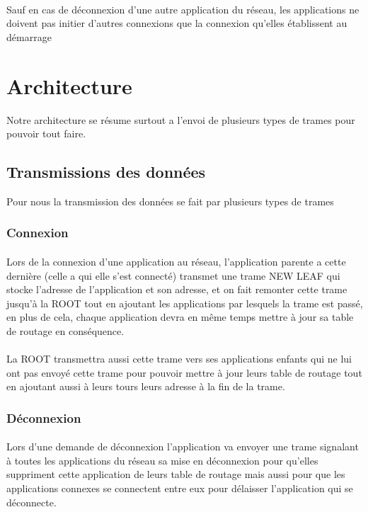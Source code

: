 \documentclass[a4paper,titlepage]{report}
\begin{document}
\paragraph{}
Sauf en cas de déconnexion d'une autre application du réseau, les applications ne doivent pas initier d'autres connexions que la connexion qu'elles établissent au démarrage
\pagebreak







\section{Architecture}
Notre architecture se résume surtout a l'envoi de plusieurs types de trames pour pouvoir tout faire.
\subsection{Transmissions des données}
Pour nous la transmission des données se fait par plusieurs types de trames 
\subsubsection{Connexion}
\paragraph{}
Lors de la connexion d'une application au réseau, l'application parente a cette dernière (celle a qui elle s'est connecté) transmet une trame NEW LEAF qui stocke l'adresse de l'application et son adresse, et on fait remonter cette trame jusqu'à la ROOT tout en ajoutant les applications par lesquels la trame est passé, en plus de cela, chaque application devra en même temps mettre à jour sa table de routage en conséquence. 
\paragraph{}
La ROOT transmettra aussi cette trame vers ses applications enfants qui ne lui ont pas envoyé cette trame pour pouvoir mettre à jour leurs table de routage tout en ajoutant aussi à leurs tours leurs adresse à la fin de la trame.

\subsubsection{Déconnexion}
\paragraph{}
Lors d'une demande de déconnexion l'application va envoyer une trame signalant à toutes les applications du réseau sa mise en déconnexion pour qu'elles suppriment cette application de leurs table de routage mais aussi pour que les applications connexes se connectent entre eux pour délaisser l'application qui se déconnecte. 
\end{document}
